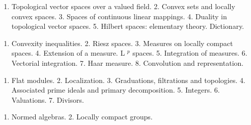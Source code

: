 \begin{enumerate}
\def\labelenumi{\arabic{enumi}.}
\tightlist
\item
  Topological vector spaces over a valued field. 2. Convex sets and locally convex spaces. 3. Spaces of continuous linear mappings. 4. Duality in topological vector spaces. 5. Hilbert spaces: elementary theory. Dictionary.
\end{enumerate}


\begin{enumerate}
\def\labelenumi{\arabic{enumi}.}
\tightlist
\item
  Convexity inequalities. 2. Riesz spaces. 3. Measures on locally compact spaces. 4. Extension of a measure. L \(^{p}\) spaces. 5. Integration of measures. 6. Vectorial integration. 7. Haar measure. 8. Convolution and representation.
\end{enumerate}




\begin{enumerate}
\def\labelenumi{\arabic{enumi}.}
\tightlist
\item
  Flat modules. 2. Localization. 3. Graduations, filtrations and topologies. 4. Associated prime ideals and primary decomposition. 5. Integers. 6. Valuations. 7. Divisors.
\end{enumerate}


\begin{enumerate}
\def\labelenumi{\arabic{enumi}.}
\tightlist
\item
  Normed algebras. 2. Locally compact groups.
\end{enumerate}


